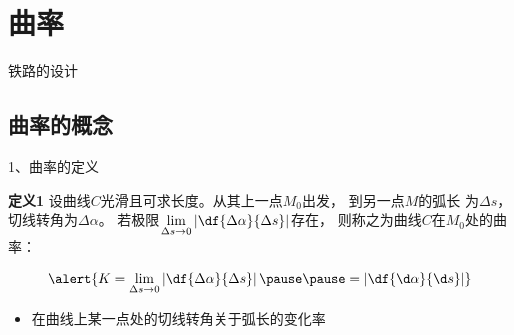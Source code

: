 \section{曲率}

\begin{frame}{铁路的设计}
	\linespread{1.2}
	\begin{center}
	\end{center}
\end{frame}

\subsection{曲率的概念}



\begin{frame}{1、曲率的定义}
	\linespread{1.5}
	\pause
	\begin{block}{{\bf 定义1}\hfill }
		设曲线$C$光滑且可求长度。\pause 从其上一点$M_0$出发，
		到另一点$M$的弧长
		为$\Delta s$，切线转角为$\Delta\alpha$。
		\pause 若极限$\lim\limits_{\Delta s\to
		0}\left|\df{\Delta\alpha}{\Delta s}\right|$存在，
		则称之为{\bb 曲线$C$在$M_0$处的曲率：}
		
		\pause\vspace{-1em}
	$$\alert{K=\lim\limits_{\Delta s\to
				0}\left|\df{\Delta\alpha}{\Delta s}\right|\pause\pause
				=\left|\df{\d\alpha}{\d s}\right|}$$ 
	\end{block}\vspace{-1ex}
	\begin{itemize}
	  \item \alert{在曲线上某一点处的切线转角关于弧长的变化率}
	\end{itemize}
\end{frame}

